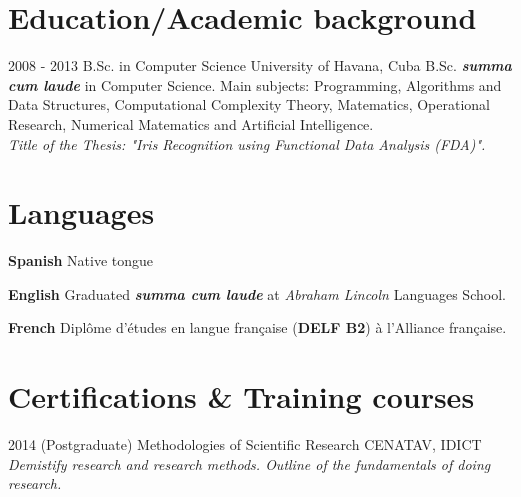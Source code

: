 \documentclass[]{friggeri-cv}
\begin{document}
\section{Education/Academic background}
\begin{entrylist}

  \entry
    {2008 - 2013}
    {B.Sc. in Computer Science}
    {University of Havana, Cuba}
    {B.Sc. \textbf{\emph{summa cum laude}} in Computer Science. Main subjects: Programming, Algorithms and Data Structures, Computational Complexity Theory, Matematics, Operational Research, Numerical Matematics and Artificial Intelligence.\\
    \emph{Title of the Thesis: "Iris Recognition using Functional Data Analysis (FDA)".}}

\end{entrylist}

\section{Languages}
\begin{entrylist}
  \entry
    {\textbf{Spanish}}
    {}
    {}
    {Native tongue}      

  \entry
    {\textbf{English}}
    {}
    {}
    {Graduated \textbf{\emph{summa cum laude}} at \emph{Abraham Lincoln} Languages School.}

  \entry
    {\textbf{French}}
    {}
    {}
    {Diplôme d'études en langue française (\textbf{DELF B2}) à l'Alliance française.}
\end{entrylist}

\section{Certifications \& Training courses}
\begin{entrylist}
  \entry
    {2014}
    {(Postgraduate) Methodologies of Scientific Research}
    {CENATAV, IDICT}
    {\emph{Demistify research and research methods. Outline of the fundamentals of doing research.}}
\end{entrylist}
\end{document}
